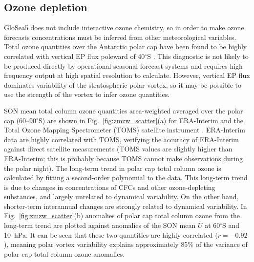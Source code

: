 \subsection{Ozone depletion}

GloSea5 does not include interactive ozone chemistry, so in order to make ozone
forecasts concentrations must be inferred from other meteorological
variables. Total ozone quantities over the Antarctic polar cap have been found
to be highly correlated with vertical EP flux poleward of 40$^{\circ}$S
\citep{Weber2011, Salby2012}. This diagnostic is not likely to be produced
directly by operational seasonal forecast systems and requires high frequency
output at high spatial resolution to calculate. However, vertical EP flux
dominates variability of the stratospheric polar vortex, so it may be possible
to use the strength of the vortex to infer ozone quantities.

SON mean total column ozone quantities area-weighted averaged over the polar cap
(60--90$^{\circ}$S) are shown in Fig.\ \ref{fig:zmzw_scatter}(a) for ERA-Interim
and the Total Ozone Mapping Spectrometer (TOMS) satellite instrument
\citep{Kroon2008}. ERA-Interim data are highly correlated with TOMS, verifying
the accuracy of ERA-Interim against direct satellite measurements (TOMS values
are slightly higher than ERA-Interim; this is probably because TOMS cannot make
observations during the polar night). The long-term trend in polar cap total
column ozone is calculated by fitting a second-order polynomial to the
data. This long-term trend is due to changes in concentrations of CFCs and other
ozone-depleting substances, and largely unrelated to dynamical variability. On
the other hand, shorter-term interannual changes are strongly related to
dynamical variability. In Fig.\ \ref{fig:zmzw_scatter}(b) anomalies of polar cap
total column ozone from the long-term trend are plotted against anomalies of the
SON mean $\overline{U}$ at 60$^{\circ}$S and 10~hPa. It can be seen that these
two quantities are highly correlated ($r=-0.92$), meaning polar vortex
variability explains approximately 85\% of the variance of polar cap total
column ozone anomalies.

